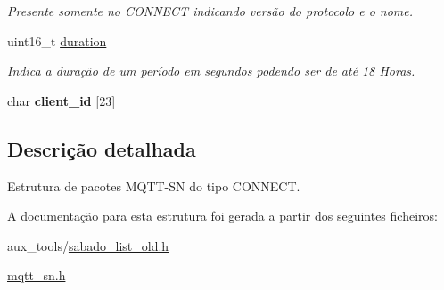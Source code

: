 \begin{DoxyCompactItemize}
\begin{DoxyCompactList}\small\item\em Presente somente no C\+O\+N\+N\+E\+C\+T indicando versão do protocolo e o nome. \end{DoxyCompactList}\item 
\hypertarget{group__Pacotes_ga71f530f1f32dbca56a6af8a5fbbfbe49}{uint16\+\_\+t \hyperlink{group__Pacotes_ga71f530f1f32dbca56a6af8a5fbbfbe49}{duration}}\label{group__Pacotes_ga71f530f1f32dbca56a6af8a5fbbfbe49}

\begin{DoxyCompactList}\small\item\em Indica a duração de um período em segundos podendo ser de até 18 Horas. \end{DoxyCompactList}\item 
\hypertarget{structconnect__packet__t_a4616f81d6902f21aa47ea49dd3d5fdce}{char {\bfseries client\+\_\+id} \mbox{[}23\mbox{]}}\label{structconnect__packet__t_a4616f81d6902f21aa47ea49dd3d5fdce}

\end{DoxyCompactItemize}


\subsection{Descrição detalhada}
Estrutura de pacotes M\+Q\+T\+T-\/\+S\+N do tipo C\+O\+N\+N\+E\+C\+T. 

A documentação para esta estrutura foi gerada a partir dos seguintes ficheiros\+:\begin{DoxyCompactItemize}
\item 
aux\+\_\+tools/\hyperlink{sabado__list__old_8h}{sabado\+\_\+list\+\_\+old.\+h}\item 
\hyperlink{mqtt__sn_8h}{mqtt\+\_\+sn.\+h}\end{DoxyCompactItemize}
